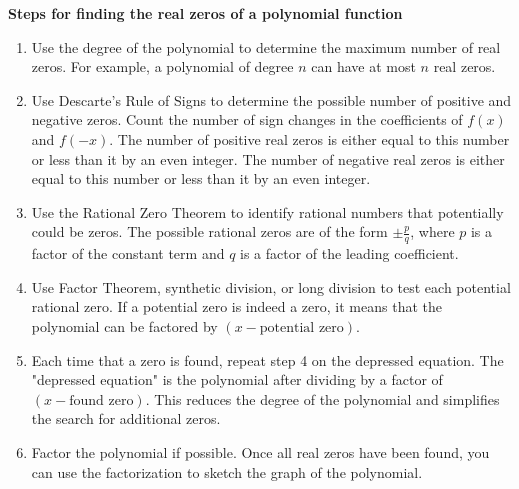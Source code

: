 \documentclass{report}
\begin{document}
    \pagebreak \bigbreak \noindent
    \begin{mdframed}
      \textbf{Steps for finding the real zeros of a polynomial function}
      \begin{enumerate}
        \item Use the degree of the polynomial to determine the maximum number of real zeros. For example, a polynomial of degree $n$ can have at most $n$ real zeros.
        \item Use Descarte’s Rule of Signs to determine the possible number of positive and negative zeros. Count the number of sign changes in the coefficients of $f(x)$ and $f(-x)$. The number of positive real zeros is either equal to this number or less than it by an even integer. The number of negative real zeros is either equal to this number or less than it by an even integer.
        \item Use the Rational Zero Theorem to identify rational numbers that potentially could be zeros. The possible rational zeros are of the form $\pm \frac{p}{q}$, where $p$ is a factor of the constant term and $q$ is a factor of the leading coefficient.
        \item Use Factor Theorem, synthetic division, or long division to test each potential rational zero. If a potential zero is indeed a zero, it means that the polynomial can be factored by $(x-\text{potential zero})$.
        \item Each time that a zero is found, repeat step 4 on the depressed equation. The "depressed equation" is the polynomial after dividing by a factor of $(x-\text{found zero})$. This reduces the degree of the polynomial and simplifies the search for additional zeros.
        \item Factor the polynomial if possible. Once all real zeros have been found, you can use the factorization to sketch the graph of the polynomial.
      \end{enumerate}
    \end{mdframed}
\end{document}

